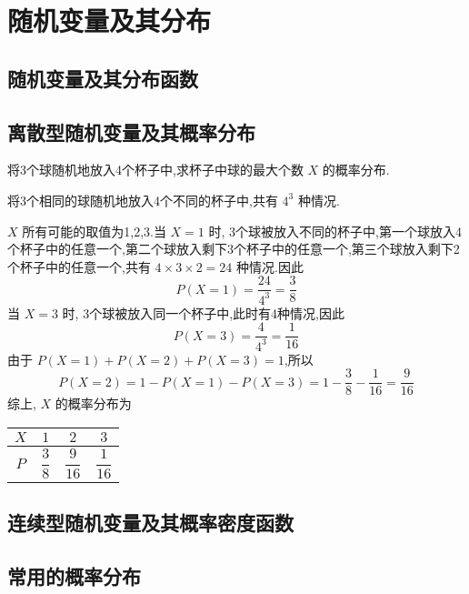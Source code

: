 
\chapter{随机变量及其分布}
\thispagestyle{plain}

\section{随机变量及其分布函数}

\section{离散型随机变量及其概率分布}

\question 将3个球随机地放入4个杯子中,求杯子中球的最大个数 $X$ 的概率分布.

\begin{solution}
    将3个相同的球随机地放入4个不同的杯子中,共有 $4^3$ 种情况.
    
    $X$ 所有可能的取值为1,2,3.当 $X=1$ 时, 3个球被放入不同的杯子中,第一个球放入4个杯子中的任意一个,第二个球放入剩下3个杯子中的任意一个,第三个球放入剩下2个杯子中的任意一个,共有 $4 \times 3 \times 2 = 24$ 种情况.因此
    $$
    P(X=1) = \dfrac{24}{4^3} = \dfrac{3}{8}
    $$
    当 $X=3$ 时, 3个球被放入同一个杯子中,此时有4种情况,因此
    $$
    P(X=3) = \dfrac{4}{4^3} = \dfrac{1}{16}
    $$
    由于 $P(X=1) + P(X=2) + P(X=3) = 1$,所以
    $$
    P(X=2) = 1 - P(X=1) - P(X=3) = 1 - \dfrac{3}{8} - \dfrac{1}{16} = \dfrac{9}{16}
    $$
    综上, $X$ 的概率分布为
    \begin{center}
        \begin{tabular}{c | c c c}
            \hline
            $X$ & $1$ & $2$ & $3$ \\
            \hline
            $P$ \rule{0pt}{20pt} & $\dfrac{3}{8}$ & $\dfrac{9}{16}$ & $\dfrac{1}{16}$ \\[6pt]
            \hline
        \end{tabular}
    \end{center}
\end{solution}

\section{连续型随机变量及其概率密度函数}

\section{常用的概率分布}

